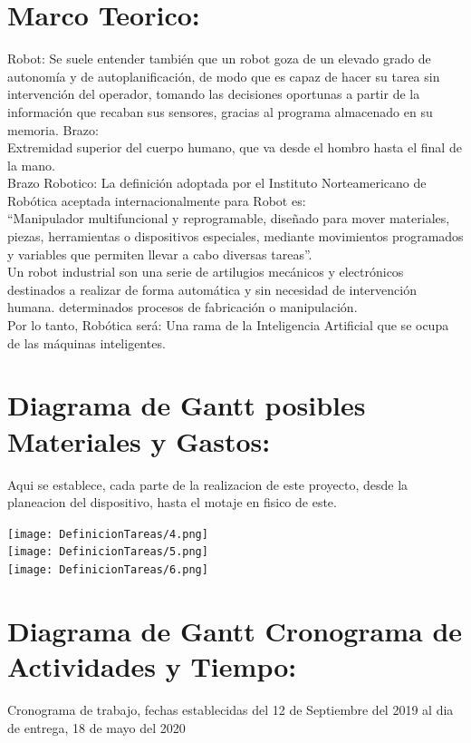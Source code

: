 \documentclass[14pt,a4paper]{article}
\begin{document}
\section{Marco Teorico:}

Robot:
Se suele entender también que un robot goza de un elevado grado de autonomía y de autoplanificación, de modo que es capaz de hacer su tarea sin intervención del operador, tomando las decisiones oportunas a partir de la información que recaban sus sensores, gracias al programa almacenado en su memoria.
Brazo:\\
Extremidad superior del cuerpo humano, que va desde el hombro hasta el final de la mano.\\

Brazo Robotico:
La definición adoptada por el Instituto Norteamericano de Robótica aceptada internacionalmente para Robot es:\\

“Manipulador multifuncional y reprogramable, diseñado para mover materiales, piezas, herramientas o dispositivos especiales, mediante movimientos programados y variables que permiten llevar a cabo diversas tareas”.\\
Un robot industrial son una serie de artilugios mecánicos y electrónicos destinados a realizar de forma automática y sin necesidad de intervención humana. determinados procesos de fabricación o manipulación.\\
Por lo tanto, Robótica será:  Una rama de la Inteligencia Artificial que se ocupa de las máquinas inteligentes.
\newpage
\section{Diagrama de Gantt posibles Materiales y Gastos:}
Aqui se establece, cada parte de la realizacion de este proyecto, desde la planeacion del dispositivo, hasta el motaje en fisico de este.

\begin{center}
 \texttt{[image: DefinicionTareas/4.png]}\\
 
 \texttt{[image: DefinicionTareas/5.png]}\\
 
 \texttt{[image: DefinicionTareas/6.png]} 
\end{center}
\newpage
\section{Diagrama de Gantt Cronograma de Actividades y Tiempo:}
Cronograma de trabajo, fechas establecidas del 12 de  Septiembre del 2019 al dia de entrega, 18 de mayo del 2020
\end{document}
